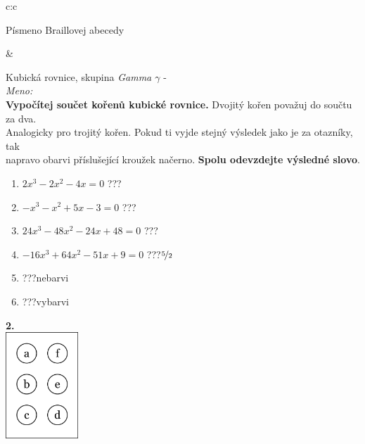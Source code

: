 \documentclass[10pt]{report}
\begin{document}
\begin{tabular}{c:c}
\begin{minipage}[c][99mm][t]{0.49\linewidth}
\begin{center}
\begin{minipage}{0.20\linewidth}
\begin{center}
{\small Písmeno Braillovej abecedy}
\end{center}
\end{minipage}
\end{center}
\end{minipage}
&
\begin{minipage}[c][99mm][t]{0.49\linewidth}
\begin{center}
\vspace{7mm}
{\huge Kubická rovnice, skupina \textit{Gamma $\gamma$} -}\\[4.5mm]
\textit{Meno:}\phantom{xxxxxxxxxxxxxxxxxxxxxxxxxxxxxxxxxxxxxxxxxxxxxxxxxxxxxxxxxxxxxxxxx}\\[3.5mm]
\textbf{Vypočítej součet kořenů kubické rovnice.} Dvojitý kořen považuj do součtu za dva.\\Analogicky pro trojitý kořen. Pokud ti vyjde stejný výsledek jako je za otazníky, tak\\napravo obarvi příslušející kroužek načerno. \textbf{Spolu odevzdejte výsledné slovo}.\\[3mm]
\begin{minipage}{0.77\linewidth}
\begin{center}
\begin{varwidth}{\textwidth}
\begin{enumerate}
\large
\item $2x^3-2x^2-4x=0$\quad \dotfill\; ???\;\dotfill {}
\item $-x^3-x^2+5x-3=0$\quad \dotfill\; ???\;\dotfill {}
\item $24x^3-48x^2-24x+48=0$\quad \dotfill\; ???\;\dotfill {}
\item $-16x^3+64x^2-51x+9=0$\quad \dotfill\; ???\;\dotfill \quad $\nicefrac{5}{2}$
\item \quad \dotfill\; ???\;\dotfill \quad nebarvi
\item \quad \dotfill\; ???\;\dotfill \quad vybarvi
\end{enumerate}
\end{varwidth}
\end{center}
\end{minipage}
\begin{minipage}{0.20\linewidth}
\begin{center}
{\Huge\bfseries 2.} \\[2mm]
\includegraphics[height=40mm]{../images/braille.png}

\end{center}
\end{minipage}
\end{center}
\end{minipage}
\end{tabular}
\end{document}
